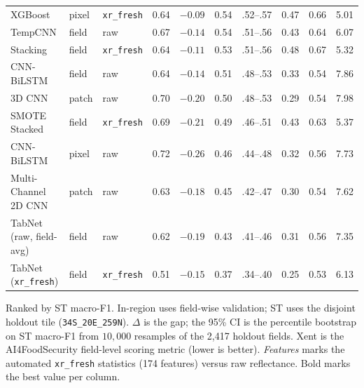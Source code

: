 \documentclass[journal]{IEEEtran}
\begin{document}
\begin{table}[!t]
\begin{tabular}{lllccccccc}
XGBoost               & pixel & \texttt{xr\_fresh} & 0.64 & $-0.09$ & 0.54 & .52--.57 & 0.47 & 0.66 & 5.01 \\
TempCNN               & field & raw & 0.67 & $-0.14$ & 0.54 & .51--.56 & 0.43 & 0.64 & 6.07 \\
Stacking              & field & \texttt{xr\_fresh} & 0.64 & $-0.11$ & 0.53 & .51--.56 & 0.48 & 0.67 & 5.32 \\
CNN-BiLSTM            & field & raw & 0.64 & $-0.14$ & 0.51 & .48--.53 & 0.33 & 0.54 & 7.86 \\
3D CNN                & patch & raw & 0.70 & $-0.20$ & 0.50 & .48--.53 & 0.29 & 0.54 & 7.98 \\
SMOTE Stacked         & field & \texttt{xr\_fresh} & 0.69 & $-0.21$ & 0.49 & .46--.51 & 0.43 & 0.63 & 5.37 \\
CNN-BiLSTM            & pixel & raw & 0.72 & $-0.26$ & 0.46 & .44--.48 & 0.32 & 0.56 & 7.73 \\
Multi-Channel 2D CNN  & patch & raw & 0.63 & $-0.18$ & 0.45 & .42--.47 & 0.30 & 0.54 & 7.62 \\
TabNet (raw, field-avg) & field & raw & 0.62 & $-0.19$ & 0.43 & .41--.46 & 0.31 & 0.56 & 7.35 \\
TabNet (\texttt{xr\_fresh}) & field & \texttt{xr\_fresh} & 0.51 & $-0.15$ & 0.37 & .34--.40 & 0.25 & 0.53 & 6.13 \\
\bottomrule
\end{tabular}
\par\vspace{3pt}
\begin{minipage}{\textwidth}
\footnotesize
Ranked by ST macro-F1. In-region uses field-wise validation; ST uses the disjoint holdout tile (\texttt{34S\_20E\_259N}). $\Delta$ is the gap; the 95\% CI is the percentile bootstrap on ST macro-F1 from $10{,}000$ resamples of the 2{,}417 holdout fields. Xent is the AI4FoodSecurity field-level scoring metric (lower is better). \emph{Features} marks the automated \texttt{xr\_fresh} statistics (174 features) versus raw reflectance. Bold marks the best value per column.
\end{minipage}
\end{table}
\end{document}
